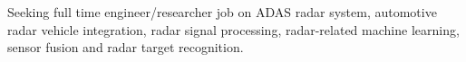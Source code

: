 \documentclass[10pt,letter,ragged2e,withhyper]{leozhang}
\begin{document}
\tagline{}

\makecvheader


\justifying



Seeking full time engineer/researcher job on ADAS radar system, automotive radar vehicle integration, radar signal processing, radar-related machine learning, sensor fusion and radar target recognition. 


\end{document}
